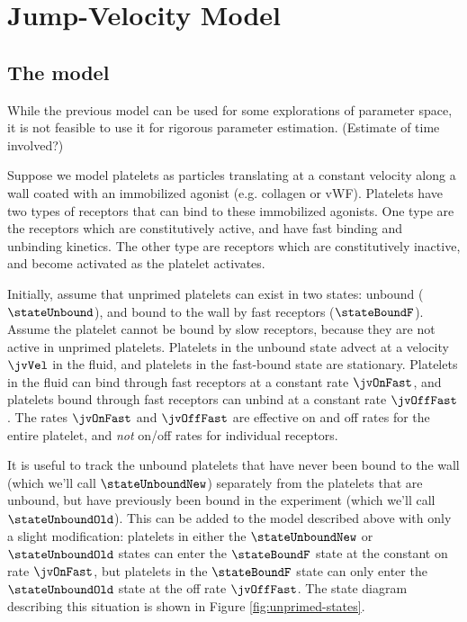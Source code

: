 
\chapter{Jump-Velocity Model}
\label{cha:jump-velocity-model}

\section{The model}
\label{sec:jv-model}

While the previous model can be used for some explorations of parameter
space, it is not feasible to use it for rigorous parameter
estimation. {\color{red} (Estimate of time involved?)}

Suppose we model platelets as particles translating at a constant
velocity along a wall coated with an immobilized agonist (e.g. collagen
or vWF). Platelets have two types of receptors that can bind to these
immobilized agonists. One type are the receptors which are
constitutively active, and have fast binding and unbinding kinetics. The
other type are receptors which are constitutively inactive, and become
activated as the platelet activates. 

Initially, assume that unprimed platelets can exist in two states:
unbound ($\stateUnbound$), and bound to the wall by fast receptors
($\stateBoundF$). Assume the platelet cannot be bound by slow receptors,
because they are not active in unprimed platelets. Platelets in the
unbound state advect at a velocity $\jvVel$ in the fluid, and platelets
in the fast-bound state are stationary. Platelets in the fluid can bind
through fast receptors at a constant rate $\jvOnFast$, and platelets
bound through fast receptors can unbind at a constant rate
$\jvOffFast$. The rates $\jvOnFast$ and $\jvOffFast$ are effective on
and off rates for the entire platelet, and \emph{not} on/off rates for
individual receptors.

It is useful to track the unbound platelets that have never been bound
to the wall (which we'll call $\stateUnboundNew$) separately from the
platelets that are unbound, but have previously been bound in the
experiment (which we'll call $\stateUnboundOld$). This can be added to
the model described above with only a slight modification: platelets in
either the $\stateUnboundNew$ or $\stateUnboundOld$ states can enter the
$\stateBoundF$ state at the constant on rate $\jvOnFast$, but platelets
in the $\stateBoundF$ state can only enter the $\stateUnboundOld$ state
at the off rate $\jvOffFast$. The state diagram describing this
situation is shown in Figure \ref{fig:unprimed-states}.

